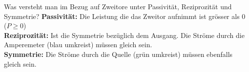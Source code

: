 
\setcounter{CardID}{37}
\begin{karte}{Was versteht man im Bezug auf Zweitore unter Passivität, Reziprozität und Symmetrie?}
	\textbf{Passivität:} Die Leistung die das Zweitor aufnimmt ist grösser als 0 ($P\ge 0$)\\
	\textbf{Reziprozität:} Ist die Symmetrie bezüglich dem Ausgang. Die Ströme durch die Amperemeter (blau umkreist) müssen gleich sein.\\
	\textbf{Symmetrie:} Die Ströme durch die Quelle (grün umkreist) müssen ebenfalls gleich sein.
	
	\centering{\scalebox{.7}{}}
\end{karte}
